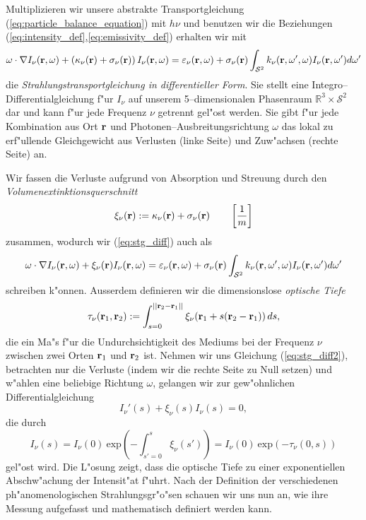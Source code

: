	Multiplizieren wir unsere abstrakte Transportgleichung (\ref{eq:particle_balance_equation}) mit $h\nu$ und benutzen wir die Beziehungen (\ref{eq:intensity_def},\ref{eq:emissivity_def}) erhalten wir mit
	\begin{equation}\label{eq:stg_diff}
	  \omega\cdot\nabla I_\nu(\mathbf{r},\omega)+\left(\kappa_\nu(\mathbf{r})+\sigma_\nu(\mathbf{r})\right)I_\nu(\mathbf{r},\omega)
	  =\varepsilon_\nu(\mathbf{r},\omega)+\sigma_\nu(\mathbf{r})\int_{\mathcal{S}^2}k_\nu(\mathbf{r},\omega',\omega)I_\nu(\mathbf{r},\omega')d\omega'
	\end{equation}
	die {\em Strahlungstransportgleichung in differentieller Form}. Sie stellt eine Integro--Differentialgleichung f"ur $I_\nu$ auf unserem 5--dimensionalen Phasenraum $\mathbb{R}^3 \times \mathcal{S}^2$ dar und kann f"ur jede Frequenz $\nu$ getrennt gel"ost werden. Sie gibt f"ur jede Kombination aus Ort $\mathbf{r}$ und Photonen--Ausbreitungsrichtung $\omega$ das lokal zu erf"ullende Gleichgewicht aus Verlusten (linke Seite) und Zuw"achsen (rechte Seite) an.
	
	Wir fassen die Verluste aufgrund von Absorption und Streuung durch den {\em Vo\-lu\-men\-ex\-tink\-ti\-ons\-quer\-schnitt}
	$$\xi_\nu(\mathbf{r}):=\kappa_\nu(\mathbf{r})+\sigma_\nu(\mathbf{r}) \qquad\left[\frac{1}{m}\right]$$
	zusammen, wodurch wir (\ref{eq:stg_diff}) auch als
	\begin{equation}\label{eq:stg_diff2}
	  \omega\cdot\nabla I_\nu(\mathbf{r},\omega)+\xi_\nu(\mathbf{r})I_\nu(\mathbf{r},\omega)
	  =\varepsilon_\nu(\mathbf{r},\omega)+\sigma_\nu(\mathbf{r})\int_{\mathcal{S}^2}k_\nu(\mathbf{r},\omega',\omega)I_\nu(\mathbf{r},\omega')d\omega'
	\end{equation}
	schreiben k"onnen.
	Ausserdem definieren wir die dimensionslose {\em optische Tiefe}
	\begin{equation*}
		\tau_\nu(\mathbf{r}_1,\mathbf{r}_2):=\int_{s=0}^{||\mathbf{r}_2-\mathbf{r}_1||} \xi_\nu(\mathbf{r}_1+s(\mathbf{r}_2 - \mathbf{r}_1))\,ds,
	\end{equation*}
	die ein Ma"s f"ur die Undurchsichtigkeit des Mediums bei der Frequenz $\nu$ zwischen zwei Orten $\mathbf{r}_1$ und $\mathbf{r}_2$ ist. Nehmen wir uns Gleichung (\ref{eq:stg_diff2}), betrachten nur die Verluste (indem wir die rechte Seite zu Null setzen) und w"ahlen eine beliebige Richtung $\omega$, gelangen wir zur gew"ohnlichen Differentialgleichung
	$$I_\nu'(s)+\xi_\nu(s)I_\nu(s)=0,$$
	die durch
	\begin{equation}
		I_\nu(s)=I_\nu(0)\:\text{exp}\left(-\int_{s'=0}^s \xi_\nu(s')\right)=I_\nu(0)\:\text{exp}\left(-\tau_\nu(0,s)\right)
		\label{eq:exponentialdecay}
	\end{equation}
	gel"ost wird. Die L"osung zeigt, dass die optische Tiefe zu einer exponentiellen Abschw"achung der Intensit"at f"uhrt. Nach der Definition der verschiedenen ph"anomenologischen Strahlungsgr"o"sen schauen wir uns nun an, wie ihre Messung aufgefasst und mathematisch definiert werden kann.
	
